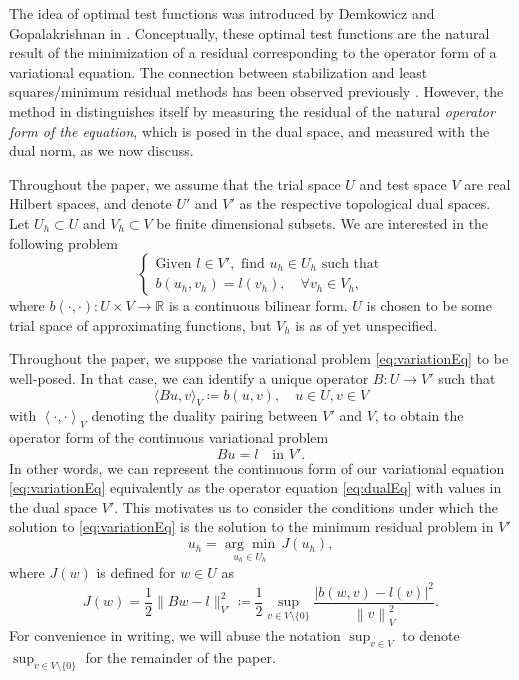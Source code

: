 \documentclass{report}
\newcommand{\eqnlab}[1]{\label{eq:#1}}
\newcommand{\eqnref}[1]{\eqref{eq:#1}}
\newcommand{\mbb}[1]{\mathbb{#1}}
\newcommand{\nor}[1]{\left\| #1 \right\|}
\newcommand{\LRp}[1]{\left( #1 \right)}
\newcommand{\LRa}[1]{\left\langle #1 \right\rangle}
\begin{document}
The idea of optimal test functions was introduced by Demkowicz and Gopalakrishnan in \cite{DPG2}.  Conceptually, these optimal test functions are the natural result of the minimization of a residual corresponding to the operator form of a variational equation. The connection between stabilization and least squares/minimum residual methods has been observed previously \cite{GLS}. However, the method in \cite{DPG2} distinguishes itself by measuring the residual of the natural \textit{operator form of the equation}, which is posed in the dual space, and measured with the dual norm, as we now discuss. 	

Throughout the paper, we assume that the trial space $U$ and test space $V$ are real Hilbert spaces, and denote $U'$ and $V'$ as the respective topological dual spaces. Let $U_h \subset U$ and $V_h\subset V$ be finite dimensional subsets. We are interested in the following problem  
\begin{equation}
\eqnlab{variationEq}
\left\{
  \begin{array}{l}
    \text{Given } l \in V', \text{ find } u_h \in U_h  \text{ such that} \\ 
    b(u_h,v_h) = l(v_h), \quad \forall v_h\in V_h,
  \end{array}
  \right.
\end{equation}
where $b\LRp{\cdot,\cdot}: U \times V \to \mbb{R}$ is a continuous
bilinear form.  $U$ is chosen to be some trial space of approximating functions, but $V_h$ is as of yet unspecified. 

Throughout the paper, we suppose the variational
problem \eqnref{variationEq} to be well-posed. In that case, we can
identify a unique operator $B:U\rightarrow V'$ such that
\[
\langle Bu,v\rangle_V \coloneqq b(u,v), \quad u\in U, v\in V
\]
with $\LRa{\cdot, \cdot}_V$ denoting the duality pairing between $V'$ and $V$, to obtain the operator form of the continuous variational problem
\begin{equation}
\eqnlab{dualEq}
Bu = l \quad \text{in } V'.
\end{equation}
In other words, we can represent the continuous form of our variational equation
\eqnref{variationEq} equivalently as the operator equation \eqnref{dualEq} with values in the
dual space $V'$.  This motivates us to consider the conditions under which the solution to \eqnref{variationEq} is the solution to the minimum residual problem in $V'$ 
\[
u_h = \underset{u_h\in U_h}{\arg\min}\, J(u_h),
\]
where $J(w)$ is defined for $w\in U$ as 
\[
J(w) = \frac{1}{2}\|Bw-l\|_{V'}^2 \coloneqq\frac{1}{2} \sup_{v\in V\setminus\{0\}} \frac{| b(w,v)-l(v)|^2}{\nor{v}_V^2}.
\]
For convenience in writing, we will abuse the notation $\sup_{v \in V}$ to denote $\sup_{v\in V\setminus\{0\}}$ for the remainder of the paper.
\end{document}
